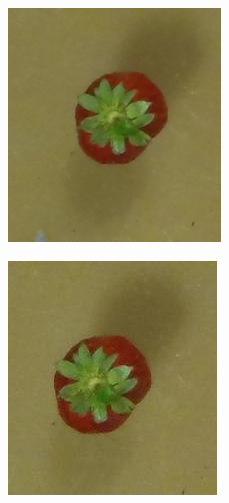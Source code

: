 \documentclass {udthesis}
\begin{document}
\begin{figure}
  \centering
  \begin{subfigure}[]{0.12\textwidth}
      \includegraphics[width=\textwidth]{strawberry4_obj_01/strawberry4_001_32}
      \caption{}
  \end{subfigure}
  \begin{subfigure}[]{0.12\textwidth}
      \includegraphics[width=\textwidth]{strawberry4_obj_01/strawberry4_001_30}

\end{subfigure}
\end{figure}
\end{document}
